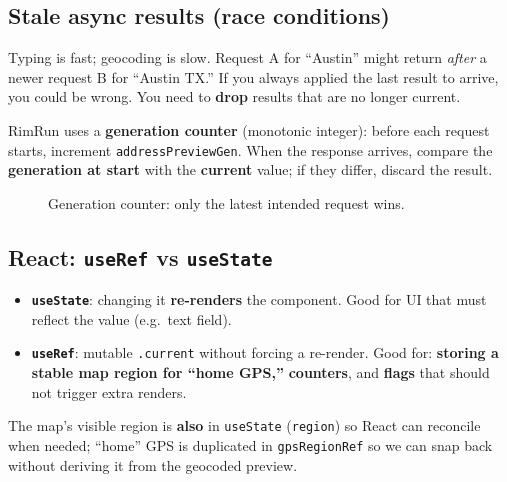 \documentclass[11pt,a4paper]{article}
\begin{document}
\subsection{Stale async results (race conditions)}

Typing is fast; geocoding is slow. Request A for ``Austin'' might return \emph{after} a newer request B for ``Austin TX.'' If you always applied the last result to arrive, you could be wrong. You need to \textbf{drop} results that are no longer current.

RimRun uses a \textbf{generation counter} (monotonic integer): before each request starts, increment \texttt{addressPreviewGen}. When the response arrives, compare the \textbf{generation at start} with the \textbf{current} value; if they differ, discard the result.

\begin{figure}[h]
\centering
{}
\caption{Generation counter: only the latest intended request wins.}
\end{figure}

\subsection{React: \texttt{useRef} vs \texttt{useState}}

\begin{itemize}[noitemsep]
    \item \textbf{\texttt{useState}}: changing it \textbf{re-renders} the component. Good for UI that must reflect the value (e.g.\ text field).
    \item \textbf{\texttt{useRef}}: mutable \texttt{.current} without forcing a re-render. Good for: \textbf{storing a stable map region for “home GPS,”} \textbf{counters}, and \textbf{flags} that should not trigger extra renders.
\end{itemize}

The map's visible region is \textbf{also} in \texttt{useState} (\texttt{region}) so React can reconcile when needed; ``home'' GPS is duplicated in \texttt{gpsRegionRef} so we can snap back without deriving it from the geocoded preview.
\end{document}
